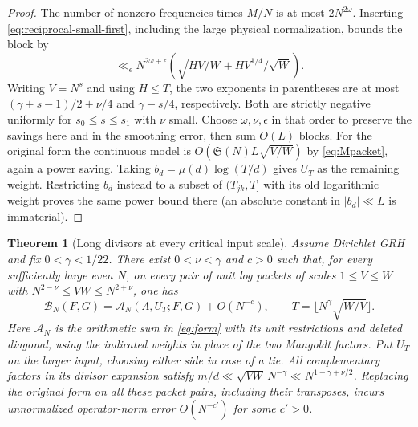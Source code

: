 \documentclass[11pt,a4paper]{article}
\numberwithin{equation}{section}
\newtheorem{theorem}{Theorem}[section]
\newcommand{\SSS}{\mathfrak S}
\newcommand{\B}{\mathcal B_N}
\begin{document}
\begin{proof}
The number of nonzero frequencies times $M/N$ is at most
$2N^{2\omega}$. Inserting \eqref{eq:reciprocal-small-first},
including the large physical normalization, bounds the block by
\[
 \ll_\epsilon N^{2\omega+\epsilon}
        \left(\sqrt{HV/W}+HV^{1/4}/\sqrt W\right).
\]
Writing $V=N^s$ and using $H\le T$, the two exponents in
parentheses are at most $(\gamma+s-1)/2+\nu/4$ and
$\gamma-s/4$, respectively. Both are strictly negative
uniformly for $s_0\le s\le s_1$ with $\nu$ small. Choose
$\omega,\nu,\epsilon$ in that order to preserve the savings
here and in the smoothing error, then sum $O(L)$ blocks.
For the original form the continuous model is
$O(\SSS(N)L\sqrt{V/W})$ by \eqref{eq:Mpacket}, again a
power saving. Taking $b_d=\mu(d)\log(T/d)$ gives $U_T$ as
the remaining weight. Restricting $b_d$ instead to a subset
of $(T_{jk},T]$ with its old logarithmic weight proves the
same power bound there (an absolute constant in $|b_d|\ll L$
is immaterial).
\end{proof}

\begin{theorem}[Long divisors at every critical input scale]
\label{thm:all-critical-long-cofactor}
Assume Dirichlet GRH and fix $0<\gamma<1/22$. There exist
$0<\nu<\gamma$ and $c>0$ such that, for every sufficiently
large even $N$, on every pair of unit log packets of scales
$1\le V\le W$ with $N^{2-\nu}\le VW\le N^{2+\nu}$, one has
\begin{equation}
 \B(F,G)=\mathcal A_N(\Lambda,U_T;F,G)+O(N^{-c}),\qquad
 T=\lfloor N^\gamma\sqrt{W/V}\rfloor .
 \label{eq:all-critical-long-cofactor}
\end{equation}
Here $\mathcal A_N$ is the arithmetic sum in \eqref{eq:form}
with its unit restrictions and deleted diagonal, using the
indicated weights in place of the two Mangoldt factors.
Put $U_T$ on the larger input, choosing either side in case
of a tie. All complementary factors in its divisor expansion
satisfy $m/d\ll \sqrt{VW}\,N^{-\gamma}\ll N^{1-\gamma+\nu/2}$.
Replacing the original form on all these packet pairs, including
their transposes, incurs unnormalized operator-norm error
$O(N^{-c'})$ for some $c'>0$.
\end{theorem}
\end{document}
